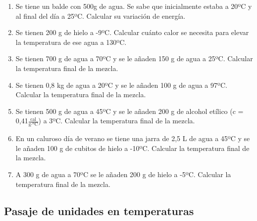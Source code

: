 \begin{enumerate}
\item Se tiene un balde con 500g de agua. Se sabe que inicialmente estaba a 20ºC y al final del día a 25ºC. Calcular su variación de energía.

\item Se tienen 200 g de hielo a -9ºC. Calcular cuánto calor se necesita para elevar la temperatura de ese agua a 130ºC.

\item Se tienen 700 g de agua a 70ºC y se le añaden 150 g de agua a 25ºC. Calcular la temperatura final de la mezcla.

\item Se tienen 0,8 kg de agua a 20ºC y se le añaden 100 g de agua a 97ºC. Calcular la temperatura final de la mezcla.

\item Se tienen 500 g de agua a 45ºC y se le añaden 200 g de alcohol etílico (c = 0,41$\frac{\text{cal}}{\text{g} \cdot \text{ºC} }$) a 3ºC. Calcular la temperatura final de la mezcla.

\item En un caluroso día de verano se tiene una jarra de 2,5 L de agua a 45ºC y se le añaden 100 g de cubitos de hielo a -10ºC. Calcular la temperatura final de la mezcla.

\item A 300 g de agua a 70ºC se le añaden 200 g de hielo a -5ºC. Calcular la temperatura final de la mezcla.

\end{enumerate}

\subsection*{Pasaje de unidades en temperaturas}

